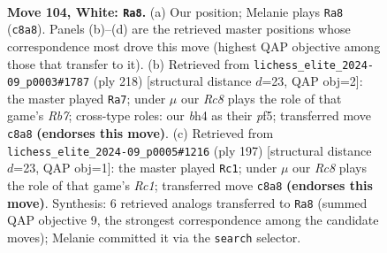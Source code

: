 \documentclass[11pt]{article}
\begin{document}
\begin{figure}[p]\centering
\begin{subfigure}{0.46\textwidth}\centering
\resizebox{\linewidth}{!}{%
\newchessgame
\chessboard[
  setfen={2R5/6rn/7p/4p3/6kb/1K1p4/8/8 w - - 4 104},
  showmover=false,
  pgfstyle=straightmove, color=movearrow, markmove={c8-a8}
]}
\caption{}
\end{subfigure}\hfill
\begin{subfigure}{0.46\textwidth}\centering
\resizebox{\linewidth}{!}{%
\newchessgame
\chessboard[
  setfen={8/1R6/6r1/5p2/8/5pk1/8/5K2 w - - 76 110},
  showmover=false,
  pgfstyle=straightmove, color=movearrow, markmove={b7-a7}
]}
\caption{}
\end{subfigure}
\\[4pt]
\begin{subfigure}{0.46\textwidth}\centering
\resizebox{\linewidth}{!}{%
\newchessgame
\chessboard[
  setfen={2r5/4k3/1R4P1/4K2p/4B2P/8/8/8 b - - 2 99},
  showmover=false,
  pgfstyle=straightmove, color=movearrow, markmove={c8-c1}
]}
\caption{}
\end{subfigure}\hfill

\caption{\textbf{Move 104, White: \texttt{Ra8}.} (a) Our position; Melanie plays \texttt{Ra8} (\texttt{c8a8}). Panels (b)--(d) are the retrieved master positions whose correspondence most drove this move (highest QAP objective among those that transfer to it). (b) Retrieved from \texttt{lichess\_elite\_2024-09\_p0003\#1787} (ply 218) [structural distance $d$=23, QAP obj=2]: the master played \texttt{Ra7}; under $\mu$ our \emph{Rc8} plays the role of that game's \emph{Rb7}; cross-type roles: our \emph{b}h4 as their \emph{p}f5; transferred move \texttt{c8a8} \textbf{(endorses this move)}. (c) Retrieved from \texttt{lichess\_elite\_2024-09\_p0005\#1216} (ply 197) [structural distance $d$=23, QAP obj=1]: the master played \texttt{Rc1}; under $\mu$ our \emph{Rc8} plays the role of that game's \emph{Rc1}; transferred move \texttt{c8a8} \textbf{(endorses this move)}. Synthesis: 6 retrieved analogs transferred to \texttt{Ra8} (summed QAP objective 9, the strongest correspondence among the candidate moves); Melanie committed it via the \texttt{search} selector.}
\label{fig:thought-m206}
\end{figure}

\clearpage
\end{document}
